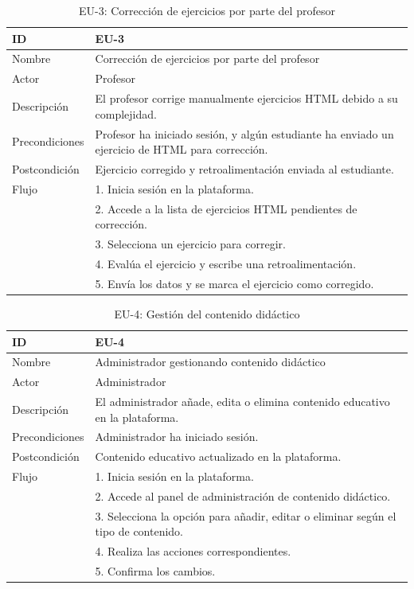 \begin{table}[H]
    \centering
    \begin{tabularx}{\textwidth}{|l|X|}
    \hline
    ID & EU-3\\
    \hline
    Nombre & Corrección de ejercicios por parte del profesor \\
    \hline
    Actor & Profesor \\
    \hline
    Descripción & El profesor corrige manualmente ejercicios HTML debido a su complejidad. \\
    \hline
    Precondiciones & Profesor ha iniciado sesión, y algún estudiante ha enviado un ejercicio de HTML para corrección. \\
    \hline
    Postcondición & Ejercicio corregido y retroalimentación enviada al estudiante. \\
    \hline
    Flujo & 
    1. Inicia sesión en la plataforma. \\
    & 2. Accede a la lista de ejercicios HTML pendientes de corrección. \\
    & 3. Selecciona un ejercicio para corregir. \\
    & 4. Evalúa el ejercicio y escribe una retroalimentación. \\
    & 5. Envía los datos y se marca el ejercicio como corregido. \\
    \hline
    \end{tabularx}
    \caption{EU-3: Corrección de ejercicios por parte del profesor}
\end{table}

\begin{table}[H]
    \centering
    \begin{tabularx}{\textwidth}{|l|X|}
    \hline
    ID & EU-4 \\
    \hline
    Nombre & Administrador gestionando contenido didáctico \\
    \hline
    Actor & Administrador \\
    \hline
    Descripción & El administrador añade, edita o elimina contenido educativo en la plataforma. \\
    \hline
    Precondiciones & Administrador ha iniciado sesión. \\
    \hline
    Postcondición & Contenido educativo actualizado en la plataforma. \\
    \hline
    Flujo & 
    1. Inicia sesión en la plataforma. \\
    & 2. Accede al panel de administración de contenido didáctico. \\
    & 3. Selecciona la opción para añadir, editar o eliminar según el tipo de contenido. \\
    & 4. Realiza las acciones correspondientes. \\
    & 5. Confirma los cambios. \\
    \hline
    \end{tabularx}
    \caption{EU-4: Gestión del contenido didáctico}
\end{table}

